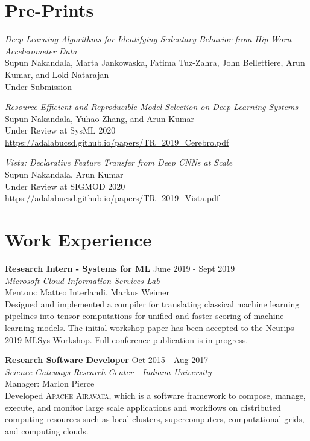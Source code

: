 \documentclass[margin]{res}
\begin{document}
\begin{resume}
\vspace{2mm}
\section{Pre-Prints}
\par
\textit{Deep Learning Algorithms for Identifying Sedentary Behavior from Hip Worn Accelerometer Data} \\
Supun Nakandala, Marta Jankowaska, Fatima Tuz-Zahra, John Bellettiere, Arun Kumar, and Loki Natarajan\\
Under Submission

\par
\textit{Resource-Efficient and Reproducible Model Selection on Deep Learning Systems} \\
Supun Nakandala, Yuhao Zhang, and Arun Kumar\\
Under Review at SysML 2020\\
\url{https://adalabucsd.github.io/papers/TR_2019_Cerebro.pdf}

\par
\textit{Vista: Declarative Feature Transfer from Deep CNNs at Scale} \\
Supun Nakandala, Arun Kumar\\
Under Review at SIGMOD 2020\\
\url{https://adalabucsd.github.io/papers/TR_2019_Vista.pdf}




\section{Work Experience}

\textbf{Research Intern - Systems for ML}
\hfill June 2019 - Sept 2019 \\
\textit{Microsoft Cloud Information Services Lab} \\
Mentors: Matteo Interlandi, Markus Weimer\\
Designed and implemented a compiler for translating classical machine learning pipelines into tensor computations for unified and faster scoring of machine learning models. The initial workshop paper has been accepted to the Neurips 2019 MLSys Workshop. Full conference publication is in progress.


\textbf{Research Software Developer}
\hfill Oct 2015 - Aug 2017 \\
\textit{Science Gateways Research Center - Indiana University} \\
Manager: Marlon Pierce\\
Developed \textsc{Apache Airavata}, which is a software framework to compose, manage, execute, and monitor large scale applications and workflows on distributed computing resources such as local clusters, supercomputers, computational grids, and computing clouds.




\end{resume}
\end{document}

